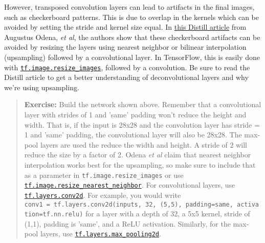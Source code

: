\documentclass[11pt]{article}
\begin{document}
However, transposed convolution layers can lead to artifacts in the
final images, such as checkerboard patterns. This is due to overlap in
the kernels which can be avoided by setting the stride and kernel size
equal. In \href{http://distill.pub/2016/deconv-checkerboard/}{this
Distill article} from Augustus Odena, \emph{et al}, the authors show
that these checkerboard artifacts can be avoided by resizing the layers
using nearest neighbor or bilinear interpolation (upsampling) followed
by a convolutional layer. In TensorFlow, this is easily done with
\href{https://www.tensorflow.org/versions/r1.1/api_docs/python/tf/image/resize_images}{\texttt{tf.image.resize\_images}},
followed by a convolution. Be sure to read the Distill article to get a
better understanding of deconvolutional layers and why we're using
upsampling.

\begin{quote}
\textbf{Exercise:} Build the network shown above. Remember that a
convolutional layer with strides of 1 and 'same' padding won't reduce
the height and width. That is, if the input is 28x28 and the convolution
layer has stride = 1 and 'same' padding, the convolutional layer will
also be 28x28. The max-pool layers are used the reduce the width and
height. A stride of 2 will reduce the size by a factor of 2. Odena
\emph{et al} claim that nearest neighbor interpolation works best for
the upsampling, so make sure to include that as a parameter in
\texttt{tf.image.resize\_images} or use
\href{\%60https://www.tensorflow.org/api_docs/python/tf/image/resize_nearest_neighbor}{\texttt{tf.image.resize\_nearest\_neighbor}}.
For convolutional layers, use
\href{https://www.tensorflow.org/api_docs/python/tf/layers/conv2d}{\texttt{tf.layers.conv2d}}.
For example, you would write
\texttt{conv1\ =\ tf.layers.conv2d(inputs,\ 32,\ (5,5),\ padding=\textquotesingle{}same\textquotesingle{},\ activation=tf.nn.relu)}
for a layer with a depth of 32, a 5x5 kernel, stride of (1,1), padding
is 'same', and a ReLU activation. Similarly, for the max-pool layers,
use
\href{https://www.tensorflow.org/api_docs/python/tf/layers/max_pooling2d}{\texttt{tf.layers.max\_pooling2d}}.
\end{quote}
\end{document}
